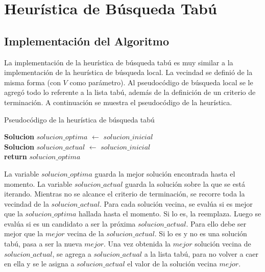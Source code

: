 \section{Heurística de Búsqueda Tabú}
\subsection{Implementación del Algoritmo}

\par{La implementación de la heurística de búsqueda tabú es muy similar a la
implementación de la heurística de búsqueda local. La vecindad se definió
de la misma forma (con $V$ como parámetro). Al pseudocódigo de búsqueda local
se le agregó todo lo referente a la lista tabú, además de la definición de un
criterio de terminación. A continuación se muestra el pseudocódigo de la
heurística.}\\

\begin{algorithm}[H]
	\caption{Pseudocódigo de la heurística de búsqueda tabú}
	\textbf{Solucion} $solucion\_optima$ $\leftarrow$ $solucion\_inicial$\\
	\textbf{Solucion} $solucion\_actual$ $\leftarrow$ $solucion\_inicial$\\
	\textbf{return} $solucion\_optima$
\end{algorithm}

\par{La variable $solucion\_optima$ guarda la mejor solución encontrada hasta
el momento. La variable $solucion\_actual$ guarda la solución sobre la que se
está iterando. Mientras no se alcance el criterio de terminación, se recorre
toda la vecindad de la $solucion\_actual$. Para cada solución vecina, se
evalúa si es mejor que la $solucion\_optima$ hallada hasta el momento. Si lo
es, la reemplaza. Luego se evalúa si es un candidato a ser la próxima
$solucion\_actual$. Para ello debe ser mejor que la $mejor$ vecina de la
$solucion\_actual$. Si lo es y no es una solución tabú, pasa a ser la nueva
$mejor$. Una vez obtenida la $mejor$ solución vecina de $solucion\_actual$,
se agrega a $solucion\_actual$ a la lista tabú, para no volver a caer en ella
y se le asigna a $solucion\_actual$ el valor de la solución vecina $mejor$.}\\

